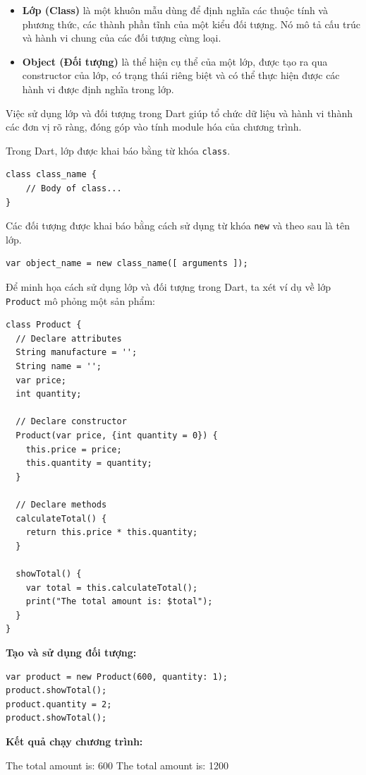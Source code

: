 \documentclass[../DoAn.tex]{subfiles}
\numberwithin{figure}{chapter}
\begin{document}
\begin{itemize}
\item \textbf{Lớp (Class)} là một khuôn mẫu dùng để định nghĩa các thuộc tính và phương thức, các thành phần tĩnh của một kiểu đối tượng. Nó mô tả cấu trúc và hành vi chung của các đối tượng cùng loại.
\item \textbf{Object (Đối tượng)} là thể hiện cụ thể của một lớp, được tạo ra qua constructor của lớp, có trạng thái riêng biệt và có thể thực hiện được các hành vi được định nghĩa trong lớp.
\end{itemize}

Việc sử dụng lớp và đối tượng trong Dart giúp tổ chức dữ liệu và hành vi thành các đơn vị rõ ràng, đóng góp vào tính module hóa của chương trình.

Trong Dart, lớp được khai báo bằng từ khóa \texttt{class}.
\begin{lstlisting}
class class_name {
    // Body of class...
}
\end{lstlisting}

Các đối tượng được khai báo bằng cách sử dụng từ khóa \texttt{new} và theo sau là tên lớp.
\begin{lstlisting}
var object_name = new class_name([ arguments ]);
\end{lstlisting}

Để minh họa cách sử dụng lớp và đối tượng trong Dart, ta xét ví dụ về lớp \texttt{Product} mô phỏng một sản phẩm:

\begin{lstlisting}
class Product {
  // Declare attributes
  String manufacture = '';
  String name = '';
  var price;
  int quantity;

  // Declare constructor
  Product(var price, {int quantity = 0}) {
    this.price = price;
    this.quantity = quantity;
  }

  // Declare methods
  calculateTotal() {
    return this.price * this.quantity;
  }

  showTotal() {
    var total = this.calculateTotal();
    print("The total amount is: $total");
  }
}
\end{lstlisting}

\textbf{Tạo và sử dụng đối tượng:}
\begin{lstlisting}
var product = new Product(600, quantity: 1);
product.showTotal();
product.quantity = 2;
product.showTotal();
\end{lstlisting}

\textbf{Kết quả chạy chương trình:}
\begin{myverbatim}
The total amount is: 600
The total amount is: 1200
\end{myverbatim}
\end{document}
